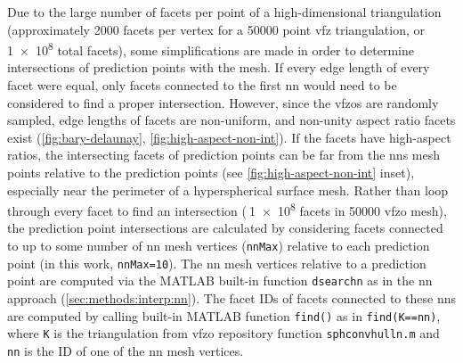 \documentclass[final,twocolumn,12pt]{elsarticle}
\newcommand{\matlab}[1]{\mbox{\lstinline[style=Matlab-editor]{#1}}}
\newcommand{\outpt}{prediction}
\newcommand{\vfzorepo}{\gls{vfzo} repository}
\begin{document}
\begin{appendices}
Due to the large number of facets per point of a high-dimensional triangulation (approximately \num{2000} facets per vertex for a \num{50000} point \gls{vfz} triangulation, or \num{1e8} total facets), some simplifications are made in order to determine intersections of \outpt{} points with the mesh. If every edge length of every facet were equal, only facets connected to the first \gls{nn} would need to be considered to find a proper intersection. However, since the \glspl{vfzo} are randomly sampled, edge lengths of facets are non-uniform, and non-unity aspect ratio facets exist (\cref{fig:bary-delaunay}, \cref{fig:high-aspect-non-int}). If the facets have high-aspect ratios, the intersecting facets of \outpt{} points can be far from the \glspl{nn} mesh points relative to the \outpt{} points (see \cref{fig:high-aspect-non-int} inset), especially near the perimeter of a hyperspherical surface mesh. Rather than loop through every facet to find an intersection ($~$\num{1e8} facets in \num{50000} \gls{vfzo} mesh), the \outpt{} point intersections are calculated by considering facets connected to up to some number of \gls{nn} mesh vertices (\matlab{nnMax}) relative to each \outpt{} point (in this work, \matlab{nnMax=10}). The \gls{nn} mesh vertices relative to a \outpt{} point are computed via the MATLAB built-in function \matlab{dsearchn} as in the \gls{nn} approach (\cref{sec:methods:interp:nn}). The facet IDs of facets connected to these \glspl{nn} are computed by calling built-in MATLAB function \matlab{find()} as in \matlab{find(K==nn)}, where \matlab{K} is the triangulation from \vfzorepo{} function \matlab{sphconvhulln.m} and \matlab{nn} is the ID of one of the \gls{nn} mesh vertices. 


\end{appendices}
\end{document}
